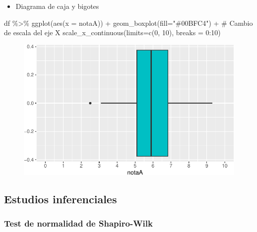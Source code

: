 \documentclass[
  a4paper,
]{scrreport}
\newenvironment{Shaded}{\begin{snugshade}}{\end{snugshade}}
\newcommand{\AttributeTok}[1]{\textcolor[rgb]{0.40,0.45,0.13}{#1}}
\newcommand{\CommentTok}[1]{\textcolor[rgb]{0.37,0.37,0.37}{#1}}
\newcommand{\DecValTok}[1]{\textcolor[rgb]{0.68,0.00,0.00}{#1}}
\newcommand{\FunctionTok}[1]{\textcolor[rgb]{0.28,0.35,0.67}{#1}}
\newcommand{\NormalTok}[1]{\textcolor[rgb]{0.00,0.23,0.31}{#1}}
\newcommand{\SpecialCharTok}[1]{\textcolor[rgb]{0.37,0.37,0.37}{#1}}
\newcommand{\StringTok}[1]{\textcolor[rgb]{0.13,0.47,0.30}{#1}}
\providecommand{\tightlist}{%
  \setlength{\itemsep}{0pt}\setlength{\parskip}{0pt}}\usepackage{longtable,booktabs,array}
\theoremstyle{definition}
\theoremstyle{definition}
\theoremstyle{remark}
\begin{document}
\begin{itemize}
\tightlist
\item
  Diagrama de caja y bigotes
\end{itemize}

\begin{Shaded}
\begin{Highlighting}[]
\NormalTok{df }\SpecialCharTok{\%\textgreater{}\%} \FunctionTok{ggplot}\NormalTok{(}\FunctionTok{aes}\NormalTok{(}\AttributeTok{x =}\NormalTok{ notaA)) }\SpecialCharTok{+} 
  \FunctionTok{geom\_boxplot}\NormalTok{(}\AttributeTok{fill=}\StringTok{"\#00BFC4"}\NormalTok{) }\SpecialCharTok{+}
  \CommentTok{\# Cambio de escala del eje X}
  \FunctionTok{scale\_x\_continuous}\NormalTok{(}\AttributeTok{limits=}\FunctionTok{c}\NormalTok{(}\DecValTok{0}\NormalTok{, }\DecValTok{10}\NormalTok{), }\AttributeTok{breaks =} \DecValTok{0}\SpecialCharTok{:}\DecValTok{10}\NormalTok{)}
\end{Highlighting}
\end{Shaded}

\begin{figure}[H]

{\centering \includegraphics{08-analisis-estadisticos_files/figure-pdf/unnamed-chunk-15-1.pdf}

}

\end{figure}

\hypertarget{estudios-inferenciales}{%
\subsection{Estudios inferenciales}\label{estudios-inferenciales}}

\hypertarget{test-de-normalidad-de-shapiro-wilk}{%
\subsubsection{Test de normalidad de
Shapiro-Wilk}\label{test-de-normalidad-de-shapiro-wilk}}
\end{document}

